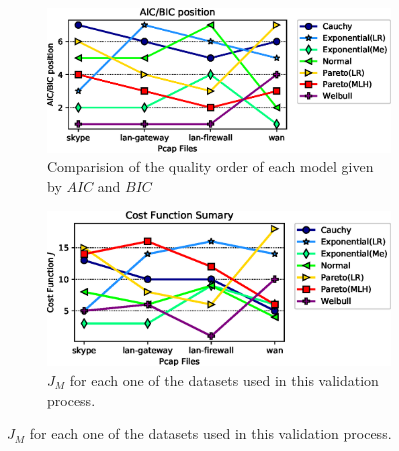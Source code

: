 \begin{figure}[!ht]
\begin{figure}[H]
    \centering
    \includegraphics[scale=0.8]{figures/ch4/aic-bic-order.eps}
    \caption{Comparision of the quality order of each model given by $AIC$ and $BIC$}
    \label{fig:aic-bic-order}
\end{figure}
\begin{figure}[H]
\centering
\includegraphics[scale=0.8]{figures/ch4/cost-function-summary.eps}
\caption{$J_M$ for each one of the datasets used in this validation process.}
\label{fig:model-order-cost}
\end{figure}
\end{figure}


